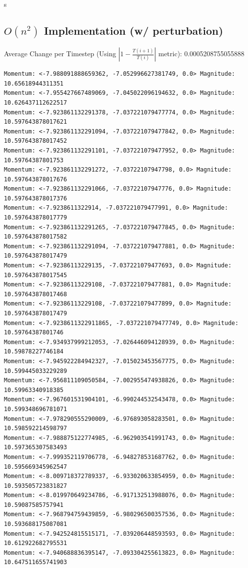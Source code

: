 s\documentclass[10pt]{article}
\begin{document}
\subsection{$O(n^2)$ Implementation (w/ perturbation)}
Average Change per Timestep (Using $|1 - \frac{T(i+1)}{T(i)}|$ metric): 0.0005208755055888
\footnotesize
\begin{verbatim}
Momentum: <-7.988091888659362, -7.052996627381749, 0.0> Magnitude: 10.65618944311351
Momentum: <-7.955427667489069, -7.045022096194632, 0.0> Magnitude: 10.626437112622517
Momentum: <-7.923861132291378, -7.037221079477774, 0.0> Magnitude: 10.597643878017621
Momentum: <-7.923861132291094, -7.037221079477842, 0.0> Magnitude: 10.597643878017452
Momentum: <-7.923861132291101, -7.037221079477952, 0.0> Magnitude: 10.59764387801753
Momentum: <-7.923861132291272, -7.03722107947798, 0.0> Magnitude: 10.597643878017676
Momentum: <-7.923861132291066, -7.03722107947776, 0.0> Magnitude: 10.597643878017376
Momentum: <-7.9238611322914, -7.037221079477991, 0.0> Magnitude: 10.597643878017779
Momentum: <-7.923861132291265, -7.037221079477845, 0.0> Magnitude: 10.597643878017582
Momentum: <-7.923861132291094, -7.037221079477881, 0.0> Magnitude: 10.597643878017479
Momentum: <-7.92386113229135, -7.037221079477693, 0.0> Magnitude: 10.597643878017545
Momentum: <-7.92386113229108, -7.037221079477881, 0.0> Magnitude: 10.597643878017468
Momentum: <-7.92386113229108, -7.037221079477899, 0.0> Magnitude: 10.597643878017479
Momentum: <-7.9238611322911865, -7.037221079477749, 0.0> Magnitude: 10.59764387801746
Momentum: <-7.934937999212053, -7.026446094128939, 0.0> Magnitude: 10.59878227746184
Momentum: <-7.945922284942327, -7.015023453567775, 0.0> Magnitude: 10.599445033229289
Momentum: <-7.956811109050584, -7.002955474938826, 0.0> Magnitude: 10.59963340918385
Momentum: <-7.967601531904101, -6.990244532543478, 0.0> Magnitude: 10.599348696781071
Momentum: <-7.978290555290009, -6.976893058283501, 0.0> Magnitude: 10.598592214598797
Momentum: <-7.988875122774985, -6.962903541991743, 0.0> Magnitude: 10.597365307583493
Momentum: <-7.999352119706778, -6.948278531687762, 0.0> Magnitude: 10.595669345962547
Momentum: <-8.009718372789337, -6.933020633854959, 0.0> Magnitude: 10.593505723831827
Momentum: <-8.019970649234786, -6.917132513988076, 0.0> Magnitude: 10.59087585757941
Momentum: <-7.968794759439859, -6.980296500357536, 0.0> Magnitude: 10.593688175087081
Momentum: <-7.942524815515171, -7.039206448593593, 0.0> Magnitude: 10.612922682795531
Momentum: <-7.940688836395147, -7.093304255613823, 0.0> Magnitude: 10.647511655741903

\end{verbatim}
\end{document}
